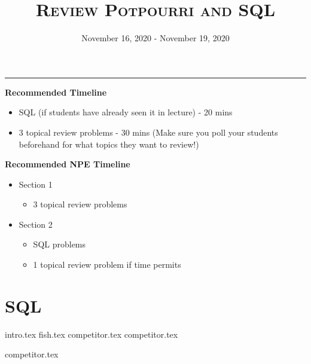 \documentclass{exam}
\title{\textsc{Review Potpourri and SQL}}
\date{November 16, 2020 - November 19, 2020}
\begin{document}
\maketitle\rule{\textwidth}{0.15em}
\fontsize{12}{15}\selectfont

\begin{blocksection}
\begin{guide}
\textbf{Recommended Timeline}
\begin{itemize}
  \item SQL (if students have already seen it in lecture) - 20 mins
  \item 3 topical review problems - 30 mins (Make sure you poll your students beforehand for what topics they want to review!)
\end{itemize}
\end{guide}
\end{blocksection}

\begin{blocksection}
\begin{guide}
\textbf{Recommended NPE Timeline}
  \begin{itemize}
  \item Section 1
  \begin{itemize}
    \item 3 topical review problems
  \end{itemize}
  \item Section 2
  \begin{itemize}
    \item SQL problems
    \item 1 topical review problem if time permits
  \end{itemize}
\end{itemize}
\end{guide}
\end{blocksection}


\section{SQL}
{intro.tex}
{fish.tex}
{competitor.tex}
{competitor.tex}

\begin{questions}
{competitor.tex}
\end{questions}
\newpage
\end{document}
